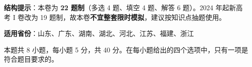 

\begin{gknotice}
\textbf{结构提示}：本卷为 \textbf{22 题制}（多选 4 题、填空 4 题、解答 6 题）。2024 年起新高考 I 卷改为 19 题制，故本卷\textbf{不宜整套限时模拟}，建议按知识点抽题使用。

\textbf{适用省份}：山东、广东、湖南、湖北、河北、江苏、福建、浙江
\end{gknotice}

\par\medskip


\begin{gktip}
本题共 8 小题，每小题 5 分，共 40 分。在每小题给出的四个选项中，只有一项是符合题目要求的。
\end{gktip}

